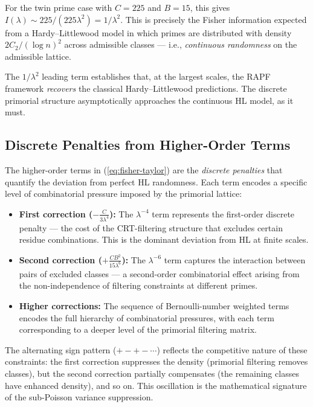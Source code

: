 \documentclass[11pt]{article}
\theoremstyle{remark}
\begin{document}
For the twin prime case with $C = 225$ and $B = 15$, this gives
$I(\lambda) \sim 225/(225 \lambda^2) = 1/\lambda^2$. This is precisely
the Fisher information expected from a Hardy--Littlewood model in which
primes are distributed with density $2C_2/(\log n)^2$ across admissible
classes — i.e., \emph{continuous randomness} on the admissible lattice.

The $1/\lambda^2$ leading term establishes that, at the largest scales,
the RAPF framework \emph{recovers} the classical Hardy--Littlewood
predictions. The discrete primorial structure asymptotically approaches
the continuous HL model, as it must.

\subsection{Discrete Penalties from Higher-Order Terms}

The higher-order terms in (\ref{eq:fisher-taylor}) are the \emph{discrete
penalties} that quantify the deviation from perfect HL randomness. Each
term encodes a specific level of combinatorial pressure imposed by the
primorial lattice:

\begin{itemize}
    \item \textbf{First correction ($-\frac{C}{3\lambda^4}$):} The
    $\lambda^{-4}$ term represents the first-order discrete penalty —
    the cost of the CRT-filtering structure that excludes certain residue
    combinations. This is the dominant deviation from HL at finite scales.
    
    \item \textbf{Second correction ($+\frac{CB^2}{15\lambda^6}$):}
    The $\lambda^{-6}$ term captures the interaction between pairs of
    excluded classes — a second-order combinatorial effect arising from
    the non-independence of filtering constraints at different primes.
    
    \item \textbf{Higher corrections:} The sequence of Bernoulli-number
    weighted terms encodes the full hierarchy of combinatorial pressures,
    with each term corresponding to a deeper level of the primorial
    filtering matrix.
\end{itemize}

The alternating sign pattern ($+ - + - \cdots$) reflects the
competitive nature of these constraints: the first correction suppresses
the density (primorial filtering removes classes), but the second
correction partially compensates (the remaining classes have enhanced
density), and so on. This oscillation is the mathematical signature of
the sub-Poisson variance suppression.
\end{document}
